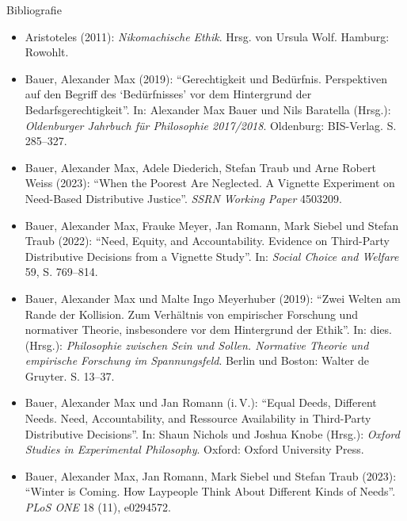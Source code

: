 \documentclass[xcolor=table,9pt,aspectratio=169]{beamer}
\begin{document}
\begin{frame}{\vspace*{10mm}Bibliografie}
\vspace*{-5mm}
{\footnotesize
\begin{itemize}[label=,leftmargin=2em,itemindent=-2em]
   \item Aristoteles (2011): \textit{Nikomachische Ethik}. Hrsg. von Ursula Wolf. Hamburg: Rowohlt.
   \item Bauer, Alexander Max (2019): \enquote{Gerechtigkeit und Bedürfnis. Perspektiven auf den Begriff des \enquote{Bedürfnisses} vor dem Hintergrund der Bedarfsgerechtigkeit}. In: Alexander Max Bauer und Nils Baratella (Hrsg.): \textit{Oldenburger Jahrbuch für Philosophie 2017/2018}. Oldenburg: BIS-Verlag. S. 285--327.
   \item Bauer, Alexander Max, Adele Diederich, Stefan Traub und Arne Robert Weiss (2023): \enquote{When the Poorest Are Neglected. A Vignette Experiment on Need-Based Distributive Justice}. \textit{SSRN Working Paper} 4503209.
   \item Bauer, Alexander Max, Frauke Meyer, Jan Romann, Mark Siebel und Stefan Traub (2022): \enquote{Need, Equity, and Accountability. Evidence on Third-Party Distributive Decisions from a Vignette Study}. In: \textit{Social Choice and Welfare} 59, S. 769--814.
   \item Bauer, Alexander Max und Malte Ingo Meyerhuber (2019): \enquote{Zwei Welten am Rande der Kollision. Zum Verhältnis von empirischer Forschung und normativer Theorie, insbesondere vor dem Hintergrund der Ethik}. In: dies. (Hrsg.): \textit{Philosophie zwischen Sein und Sollen. Normative Theorie und empirische Forschung im Spannungsfeld}. Berlin und Boston: Walter de Gruyter. S. 13--37.
   \item Bauer, Alexander Max und Jan Romann (i.\,V.): \enquote{Equal Deeds, Different Needs. Need, Accountability, and Ressource Availability in Third-Party Distributive Decisions}. In: Shaun Nichols und Joshua Knobe (Hrsg.): \textit{Oxford Studies in Experimental Philosophy}. Oxford: Oxford University Press.
   \item Bauer, Alexander Max, Jan Romann, Mark Siebel und Stefan Traub (2023): \enquote{Winter is Coming. How Laypeople Think About Different Kinds of Needs}. \textit{PLoS ONE} 18 (11), e0294572.
\end{itemize}
}
\end{frame}
\end{document}
